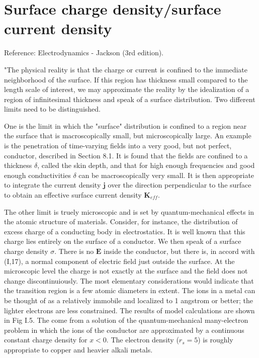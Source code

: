 \documentclass[11pt]{article}
\newcommand{\J}{\mathbf{j}}
\newcommand{\E}{\mathbf{E}}
\begin{document}
\section{Surface charge density/surface current density}
Reference: Electrodynamics - Jackson (3rd edition).

"The physical reality is that the charge or current is confined to the immediate neighborhood of the surface. If this region has thickness small compared to the length scale of interest, we may approximate the reality by the idealization of a region of infinitesimal thickness and speak of a surface distribution. Two different limits need to be distinguished. 

One is the limit in which the "surface" distribution is confined to a region near the surface that is macroscopically small, but microscopically large. An example is the penetration of time-varying fields into a very good, but not perfect, conductor, described in Section 8.1. It is found that the fields are confined to a thickness $\delta$, called the skin depth, and that for high enough frequencies and good enough conductivities $\delta$ can be macroscopically very small. It is then appropriate to integrate the current density $\J$ over the direction perpendicular to the surface to obtain an effective surface current density $\mathbf{K}_{eff}$.

The other limit is truely microscopic and is set by quantum-mechanical effects in the atomic structure of materials. Consider, for instance, the distribution of excess charge of a conducting body in electrostatics. It is well known that this charge lies entirely on the surface of a conductor. We then speak of a surface charge density $\sigma$. There is no $\E$ inside the conductor, but there is, in accord with (I,17), a normal component of electric field just outside the surface. At the microscopic level the charge is not exactly at the surface and the field does not change discontinuiously. The most elementary considerations would indicate that the transition region is a few atomic diameters in extent. The ions in a metal can be thought of as a relatively immobile and localized to 1 angstrom or better; the lighter electrons are less constrained. The results of model calculations are shown in Fig I.5. The come from a solution of the quantum-mechanical many-electron problem in which the ions of the conductor are approximated by a continuous constant charge density for $x<0$. The electron density ($r_s=5$) is roughly appropriate to copper and heavier alkali metals.
\end{document}
